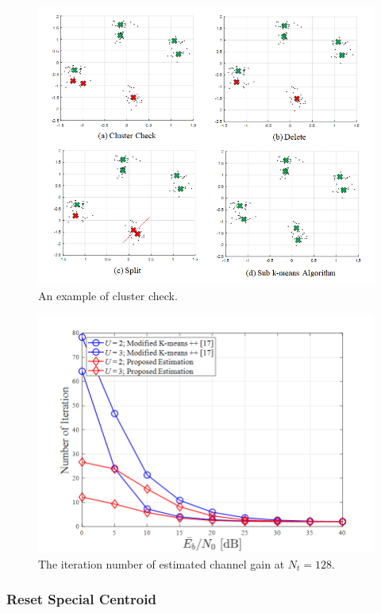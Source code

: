 \begin{figure}[t!]
 \centering
 \includegraphics[width=14cm]{fig/cluster_check.png}
 \caption{An example of cluster check.}
 \label{fig:cluster_check}
\end{figure}

\begin{figure}[b!]
 \centering
 \includegraphics[width=14cm]{fig/channel_gain_iteration_128.png}
 \caption{The iteration number of estimated channel gain at $N_t=128$.}
 \label{fig:channel_gain_iteration_128}
\end{figure}


\subsubsection{Reset Special Centroid}

